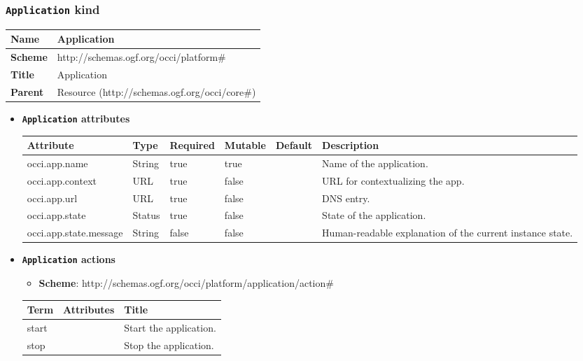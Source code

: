 \subsubsection{\texttt{Application} kind}
\begin{center}
\begin{tabular}{|l|l|}
  \hline
  \textbf{Name} & Application \\
  \hline  
  \textbf{Scheme} & http://schemas.ogf.org/occi/platform\# \\
  \hline
  \textbf{Title} & Application \\
  \hline
  \textbf{Parent} & Resource (http://schemas.ogf.org/occi/core\#) \\
  \hline
\end{tabular}
\end{center}
\begin{itemize}
\item \textbf{\texttt{Application} attributes}

\begin{tabularx}{\textwidth}{|l|l|p{1.4cm}|p{1.3cm}|l|X|}
  \hline
  \textbf{Attribute} & \textbf{Type} & \textbf{Required} & \textbf{Mutable} & \textbf{Default} & \textbf{Description} \\
  \hline  
  occi.app.name & String & true & true &  & Name of the application. \\
  \hline
  occi.app.context & URL & true & false &  & URL for contextualizing the app. \\
  \hline
  occi.app.url & URL & true & false &  & DNS entry. \\
  \hline
  occi.app.state & Status & true & false &  & State of the application. \\
  \hline
  occi.app.state.message & String & false & false &  & Human-readable explanation of the current instance state. \\
  \hline
\end{tabularx}
\end{itemize}

\begin{itemize}
\item \textbf{\texttt{Application} actions}

\begin{itemize}
	\item \textbf{Scheme}: http://schemas.ogf.org/occi/platform/application/action\#
\end{itemize}

\begin{center}
\begin{tabular}{|l|l|l|}
  \hline
  \textbf{Term}  & \textbf{Attributes} & \textbf{Title} \\
  \hline  
  start & & Start the application. \\
  \hline
  stop & & Stop the application. \\
  \hline
\end{tabular}
\end{center}
\end{itemize}


